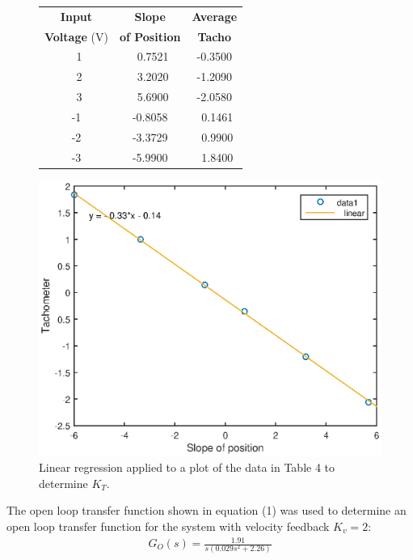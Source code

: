 \documentclass{article}
\begin{document}
\begin{figure}[H]
	\hspace{0.55cm}
	\begin{minipage}{7cm}
		\begin{tabular}{ccc}
			\toprule
			\textbf{Input}  & \textbf{Slope} & \textbf{Average}\\
			\textbf{Voltage} ($\si{\volt}$) & \textbf{of Position} & \textbf{Tacho}\\
			\midrule
			\ 1	&	\ 0.7521  & 	-0.3500\\
			\ 2	&	\ 3.2020	&   -1.2090\\
			\ 3	&	\ 5.6900	&   -2.0580\\
			-1	&	-0.8058	&    \ 0.1461\\
			-2	&	-3.3729	&    \ 0.9900\\
			-3	&	-5.9900 &   \ 1.8400\\
			\bottomrule
		\end{tabular}
	\end{minipage}
	\hspace{1cm}
	\begin{minipage}{7cm}
		\centering
		\includegraphics[scale=0.5]{fig19}
		\caption{Linear regression applied to a plot of the data in Table 4 to determine $K_T$.}
	\end{minipage}
\end{figure}

The open loop transfer function shown in equation (1) was used to determine an open loop transfer function for the system with velocity feedback $K_v = 2$:
\begin{align}
	G_O(s) = \frac{1.91}{s(0.029s^2 + 2.26)}
\end{align}
\end{document}
